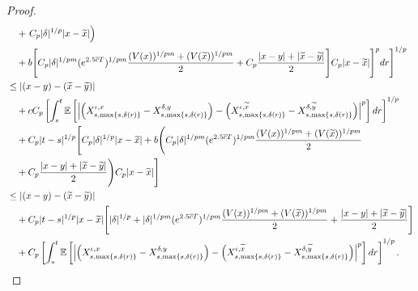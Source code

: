 \documentclass[11pt]{article}
\theoremstyle{theorem}
\theoremstyle{definition}
\newcommand{\1}{{\bf 1}}
\begin{document}
\begin{proof}
\begin{align*}
  & \quad +\left. C_p  |\delta|^{1/p} |x-\widetilde{x}| \right) \notag\\
  & \quad + b \Biggl[ C_p |\delta|^{1/pm} (e^{2.5\overline{c}T})^{1/pm} \frac{ (V(x))^{1/pm}+(V(\widetilde{x}))^{1/pm}}{2}  + C_p \dfrac{|x-y|+ |\widetilde{x}-\widetilde{y}|}{2}  \Biggr] C_p |x-\widetilde{x}|    \Biggl ]^p dr \Biggl ] ^{1/p}\notag\\
& \leq |(x-y)-(\widetilde{x}-\widetilde{y})|  \notag\\
&\quad  + c C_p  \left[ \int_s^t  \mathbb{E}\left[\left|\left(X^{\iota, x}_{s,\max\{s, \delta(r)\}}-X^{\delta,y}_{s,\max \{s, \delta(r)\}}\right) - \left(X^{\iota, \widetilde{x}}_{s,\max\{s, \delta(r)\}}-X^{\delta, \widetilde{y}}_{s,\max \{s, \delta(r)\}}\right)\right|^p\right] dr\right]^{1/p} \notag\\ 
& \quad + C_p |t-s|^{1/p}  \Bigg[  C_p  |\delta |^{1/p} |x-\widetilde{x}| +b \Biggl(  C_p |\delta|^{1/pm} (e^{2.5\overline{c}T})^{1/pm} \frac{ (V(x))^{1/pm}+(V(\widetilde{x}))^{1/pm}}{2} \notag \\
& \quad  + C_p \dfrac{|x-y|+ |\widetilde{x}-\widetilde{y}|}{2}  \Biggr) C_p |x-\widetilde{x}|\Bigg]\notag\\
& \leq |(x-y)-(\widetilde{x}-\widetilde{y})|  \notag\\ 
& \quad + C_p |t-s|^{1/p} |x-\widetilde{x}| \Bigg[  |\delta |^{1/p}  +   |\delta|^{1/pm} (e^{2.5\overline{c}T})^{1/pm} \frac{ (V(x))^{1/pm}+(V(\widetilde{x}))^{1/pm}}{2}  +  \dfrac{|x-y|+ |\widetilde{x}-\widetilde{y}|}{2}    \Bigg]\notag\\
& \quad +   C_p  \left[ \int_s^t  \mathbb{E}\left[\left|\left(X^{\iota, x}_{s,\max \{s, \delta(r)\}}-X^{\delta,y}_{s,\max \{s, \delta(r)\}}\right) - \left(X^{\iota, \widetilde{x}}_{s,\max \{s, \delta(r)\}}-X^{\delta, \widetilde{y}}_{s,\max \{s, \delta(r)\}}\right)\right|^p\right] dr\right]^{1/p}.

\end{align*}
\end{proof}
\end{document}
